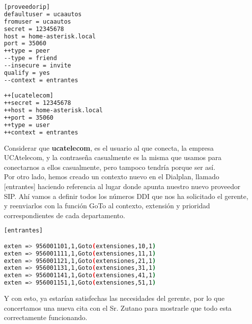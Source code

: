 \begin{lstlisting}[language=bash,title={/etc/asterisk/sip.conf}]
[proveedorip]
defaultuser = ucaautos
fromuser = ucaautos
secret = 12345678
host = home-asterisk.local
port = 35060
++type = peer
--type = friend
--insecure = invite
qualify = yes
--context = entrantes

++[ucatelecom]
++secret = 12345678
++host = home-asterisk.local
++port = 35060
++type = user
++context = entrantes
\end{lstlisting}

Considerar que \textbf{ucatelecom}, es el usuario al que conecta, la empresa UCAtelecom, y la contraseña casualmente es la misma que usamos para conectarnos a ellos casualmente, pero tampoco tendría porque ser así.\\

Por otro lado, hemos creado un contexto nuevo en el Dialplan, llamado [entrantes] haciendo referencia al lugar donde apunta nuestro nuevo proveedor SIP. Ahí vamos a definir todos los números DDI que nos ha solicitado el gerente, y reenviarlos con la función GoTo al contexto, extensión y prioridad correspondientes de cada departamento.\\

\begin{lstlisting}[language=bash,title={/etc/asterisk/extensions.conf}]
[entrantes]

exten => 956001101,1,Goto(extensiones,10,1)
exten => 956001111,1,Goto(extensiones,11,1)
exten => 956001121,1,Goto(extensiones,21,1)
exten => 956001131,1,Goto(extensiones,31,1)
exten => 956001141,1,Goto(extensiones,41,1)
exten => 956001151,1,Goto(extensiones,51,1)
\end{lstlisting}

Y con esto, ya estarían satisfechas las necesidades del gerente, por lo que concertamos una nueva cita con el Sr. Zutano para mostrarle que todo esta correctamente funcionando.
